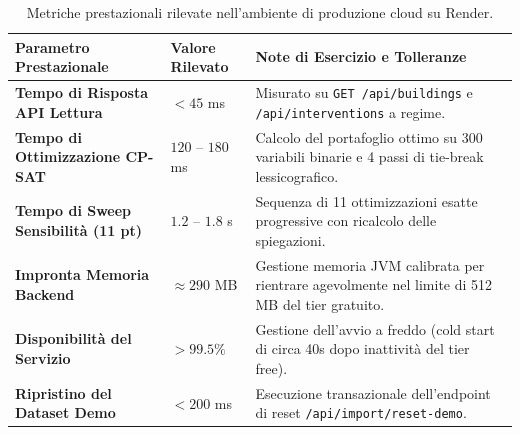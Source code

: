 \begin{table}[H]
\centering
\small
\begin{tabularx}{\textwidth}{@{} >{\bfseries}p{4.8cm} p{2.4cm} >{\RaggedRight\arraybackslash}X @{}}
\toprule
\textbf{Parametro Prestazionale} & \textbf{Valore Rilevato} & \textbf{Note di Esercizio e Tolleranze} \\
\midrule
Tempo di Risposta API Lettura & $< 45$ ms & Misurato su \texttt{GET /api/buildings} e \texttt{/api/interventions} a regime. \\
Tempo di Ottimizzazione CP-SAT & $120$ -- $180$ ms & Calcolo del portafoglio ottimo su 300 variabili binarie e 4 passi di tie-break lessicografico. \\
Tempo di Sweep Sensibilità (11 pt) & $1.2$ -- $1.8$ s & Sequenza di 11 ottimizzazioni esatte progressive con ricalcolo delle spiegazioni. \\
Impronta Memoria Backend & $\approx 290$ MB & Gestione memoria JVM calibrata per rientrare agevolmente nel limite di 512 MB del tier gratuito. \\
Disponibilità del Servizio & $> 99.5\%$ & Gestione dell'avvio a freddo (cold start di circa 40s dopo inattività del tier free). \\
Ripristino del Dataset Demo & $< 200$ ms & Esecuzione transazionale dell'endpoint di reset \texttt{/api/import/reset-demo}. \\
\bottomrule
\end{tabularx}
\caption{Metriche prestazionali rilevate nell'ambiente di produzione cloud su Render.}
\label{tab:sla_produzione}
\end{table}
